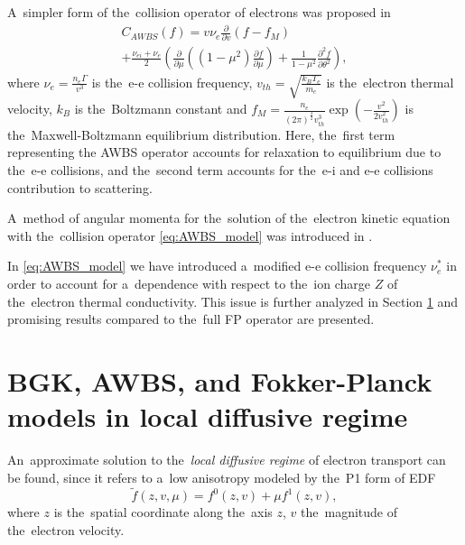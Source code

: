 \documentclass[
 aps,
 jmp,
 amsmath,amssymb,
 twocolumn,
]{revtex4-1}
\newcommand{\pdv}[2]{\frac{\partial{#1}}{\partial{#2}}}
\newcommand{\Zbar}{Z}
\newcommand{\nue}{\nu_{e}}
\newcommand{\nuei}{\nu_{ei}}
\newcommand{\vmag}{v}
\newcommand{\vth}{v_{th}}
\newcommand{\me}{m_e}
\newcommand{\kB}{k_B}
\newcommand{\fM}{f_M}
\newcommand{\ft}{f}
\newcommand{\corrMH}[1]{ {\color{red} #1} }
\begin{document}
\corrMH{
A~simpler form of the~collision operator of electrons was proposed in 
\cite{Sorbo_2015}
\begin{multline}
  C_{AWBS}(\ft) = \vmag \nue\pdv{}{\vmag}\left(\ft - \fM\right) \\
  + \frac{\nuei + \nue}{2} 
  \left(\pdv{}{\mu}\left((1 - \mu^2)\pdv{f}{\mu}\right)
  + \frac{1}{1-\mu^2}\frac{\partial^2f}{\partial\theta^2} \right)
  , \label{eq:AWBS_model}
\end{multline}
where $\nue = \frac{n_e \Gamma}{\vmag^3}$ is the~e-e collision 
frequency, $\vth = \sqrt{\frac{\kB T_e}{\me}}$ is the~electron thermal 
velocity, $\kB$ is the~Boltzmann constant and 
$\fM = \frac{n_e}{(2\pi)^{\frac{3}{2}}\vth^3}
\exp\left(-\frac{\vmag^2}{2\vth^2}\right)$ 
is the~Maxwell-Boltzmann equilibrium distribution.
Here, the~first term representing the AWBS operator \cite{AWBS_PRL1986}
accounts for relaxation to equilibrium due to the~e-e collisions, and 
the~second term accounts for the~e-i and e-e collisions contribution 
to scattering.

A~method of angular momenta for the~solution of the~electron kinetic equation
with the~collision operator \eqref{eq:AWBS_model} 
was introduced in \cite{Sorbo_2015, Sorbo_2016}. 

In \eqref{eq:AWBS_model} we have introduced a~modified e-e collision frequency
$\nue^*$ in order to account for a~dependence with respect to 
the~ion charge $\Zbar$ of the~electron thermal conductivity. This issue
is further analyzed in Section \ref{sec:DiffusiveKinetics} and promising 
results compared to the~full FP operator are presented.
}

\section{BGK, AWBS, and Fokker-Planck models in local diffusive regime}
\label{sec:DiffusiveKinetics}
An~approximate solution to the~\textit{local diffusive regime} 
of electron transport can be found, since it
refers to a~low anisotropy modeled by the~P1 form of EDF  
\begin{equation}
  \tilde{\ft}(z, \vmag, \mu) = \ft^0(z, \vmag) + \mu \ft^1(z, \vmag),
  \label{eq:f_approximation}
\end{equation}
where $z$ is the~spatial coordinate along the~axis $z$, $\vmag$ 
the~magnitude of the~electron velocity. 
\end{document}
